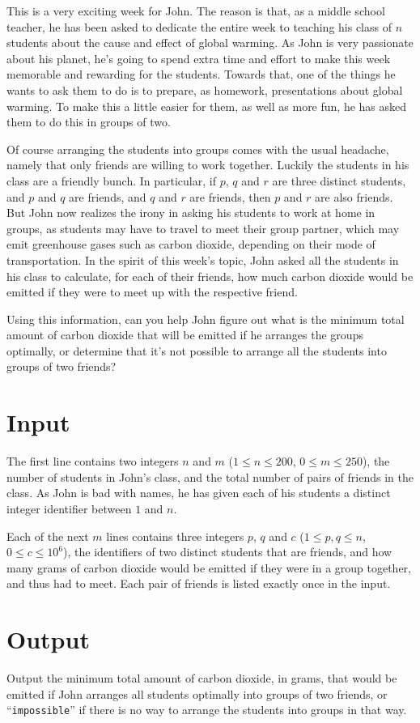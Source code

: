 
This is a very exciting week for John. The reason is that, as a middle school
teacher, he has been asked to dedicate the entire week to teaching his class of
$n$ students about the cause and effect of global warming. As John is very
passionate about his planet, he's going to spend extra time and effort to make
this week memorable and rewarding for the students. Towards that, one of the
things he wants to ask them to do is to prepare, as homework, presentations
about global warming. To make this a little easier for them, as well as more
fun, he has asked them to do this in groups of two.

Of course arranging the students into groups comes with the usual headache,
namely that only friends are willing to work together. Luckily the students in
his class are a friendly bunch. In particular, if $p$, $q$ and $r$ are three
distinct students, and $p$ and $q$ are friends, and $q$ and $r$ are friends,
then $p$ and $r$ are also friends. But John now realizes the irony in asking
his students to work at home in groups, as students may have to travel
to meet their group partner, which may emit greenhouse gases such as carbon
dioxide, depending on their mode of transportation. In the spirit of this
week's topic, John asked all the students in his class to calculate, for each
of their friends, how much carbon dioxide would be emitted if they were to meet
up with the respective friend.

Using this information, can you help John figure out what is the minimum total
amount of carbon dioxide that will be emitted if he arranges the groups
optimally, or determine that it's not possible to arrange all the students into
groups of two friends?

\section*{Input}
The first line contains two integers $n$ and $m$ ($1 \leq n \leq 200$, $0 \leq m \leq 250$), the
number of students in John's class, and the total number of pairs of friends in
the class. As John is bad with names, he has given each of his students a
distinct integer identifier between $1$ and $n$.

Each of the next $m$ lines contains three integers $p$, $q$ and $c$ ($1 \leq p,
q \leq n$, $0 \leq c \leq 10^6$), the identifiers of two distinct students
that are friends, and how many grams of carbon dioxide would be emitted if they
were in a group together, and thus had to meet. Each pair of friends is listed
exactly once in the input.

\section*{Output}
Output the minimum total amount of carbon dioxide, in grams, that would be
emitted if John arranges all students optimally into groups of two friends, or
``\texttt{impossible}'' if there is no way to arrange the students into groups
in that way.

